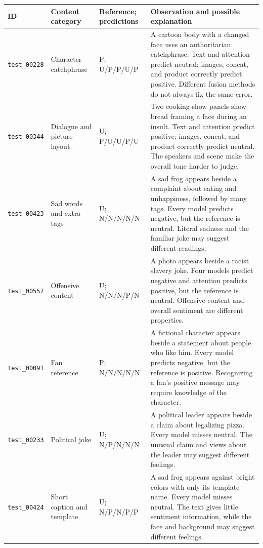 \documentclass[11pt,a4paper]{article}
\begin{document}
\begin{table}[p]
\centering\small
\begin{tabular}{>{\raggedright\arraybackslash}p{1.95cm}>{\raggedright\arraybackslash}p{2.30cm}>{\raggedright\arraybackslash}p{2.1cm}>{\raggedright\arraybackslash}p{7.1cm}}
\toprule
ID & Content category & Reference; predictions & Observation and possible explanation \\
\midrule
\texttt{test\_00228} & Character catchphrase & P; U/P/P/U/P & A cartoon body with a changed face uses an authoritarian catchphrase. Text and attention predict neutral; images, concat, and product correctly predict positive. Different fusion methods do not always fix the same error. \\[4pt]
\texttt{test\_00344} & Dialogue and picture layout & U; P/U/U/P/U & Two cooking-show panels show bread framing a face during an insult. Text and attention predict positive; images, concat, and product correctly predict neutral. The speakers and scene make the overall tone harder to judge. \\[4pt]
\texttt{test\_00423} & Sad words and extra tags & U; N/N/N/N/N & A sad frog appears beside a complaint about eating and unhappiness, followed by many tags. Every model predicts negative, but the reference is neutral. Literal sadness and the familiar joke may suggest different readings. \\[4pt]
\texttt{test\_00557} & Offensive content & U; N/N/N/P/N & A photo appears beside a racist slavery joke. Four models predict negative and attention predicts positive, but the reference is neutral. Offensive content and overall sentiment are different properties. \\[4pt]
\texttt{test\_00091} & Fan reference & P; N/N/N/N/N & A fictional character appears beside a statement about people who like him. Every model predicts negative, but the reference is positive. Recognizing a fan's positive message may require knowledge of the character. \\[4pt]
\texttt{test\_00233} & Political joke & U; N/P/N/N/N & A political leader appears beside a claim about legalizing pizza. Every model misses neutral. The unusual claim and views about the leader may suggest different feelings. \\[4pt]
\texttt{test\_00424} & Short caption and template & U; N/P/N/P/P & A sad frog appears against bright colors with only its template name. Every model misses neutral. The text gives little sentiment information, while the face and background may suggest different feelings. \\[4pt]

\end{tabular}
\end{table}
\end{document}
